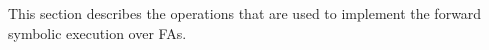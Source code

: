 This section describes the operations that are used to
implement the forward symbolic execution over FAs. 
%
%
%
%
%
